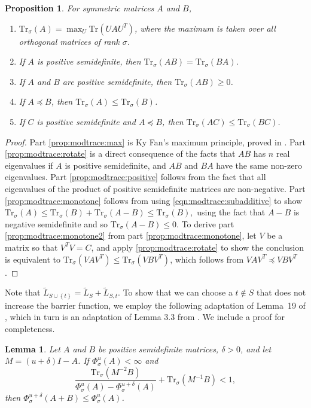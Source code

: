 \documentclass[11pt]{article}
\def\trace#1{\mathrm{Tr} \left(#1 \right)}
\def\Ltil{\widetilde{L}}
\def\union{\cup}
\def\pleq{\preccurlyeq}
\def\setof#1{\left\{#1  \right\}}
\def\trs#1{\mathrm{Tr}_{\sigma} \left(#1 \right)}
\newtheorem{lemma}[theorem]{Lemma}
\newtheorem{proposition}[theorem]{Proposition}
\begin{document}
\begin{proposition}\label{prop:modtrace}
For symmetric matrices $A$ and $B$,
  \begin{enumerate}[label=\alph*., ref=\alph*]
    \item $\trs{A} = \max_{U} \trace{U A U^T}$, where the maximum is taken over all orthogonal matrices of rank $\sigma$. \label{prop:modtrace:max}
    \item If $A$ is positive semidefinite, then $\trs{AB} = \trs{BA}$. \label{prop:modtrace:rotate}
    \item If $A$ and $B$ are positive semidefinite, then $\trs{AB} \geq 0$. \label{prop:modtrace:positive}
    \item If $A \pleq B$, then $\trs{A} \leq \trs{B}$. \label{prop:modtrace:monotone}
    \item If $C$ is positive semidefinite and $A \pleq B$, then $\trs{AC} \leq \trs{BC}$. \label{prop:modtrace:monotone2}
  \end{enumerate}
\end{proposition}
\begin{proof}
Part \ref{prop:modtrace:max} is Ky Fan's maximum principle, proved in \cite{KyFanWeyl}. Part \ref{prop:modtrace:rotate} is a direct consequence of the facts that $AB$ has $n$ real eigenvalues if $A$ is positive semidefinite, and $AB$ and $BA$ have the same non-zero eigenvalues. 
Part \ref{prop:modtrace:positive} follows from the fact that all eigenvalues of the product of positive semidefinite matrices are non-negative.
Part \ref{prop:modtrace:monotone} follows from using \eqref{eqn:modtrace:subadditive} to show $\trs{A} \leq \trs{B} + \trs{A - B} \leq \trs{B},$ using the fact that $A - B$ is negative semidefinite and so $\trs{A - B} \leq 0$.  
To derive part \ref{prop:modtrace:monotone2} from part \ref{prop:modtrace:monotone}, let $V$ be a matrix so that $V^T V = C$, and apply \ref{prop:modtrace:rotate} to show the conclusion is equivalent to $\trs{V A V^T} \leq \trs{V B V^T}$, which follows from $V A V^T \pleq V B V^T$.
\end{proof}


Note that $\Ltil_{S \union \setof{t}} = \Ltil_{S} + \Ltil_{S,t}$.
To show that we can choose a $t \not \in S$ that does not increase the barrier function, 
  we employ the following adaptation of 
 Lemma~19 of \cite{CarliSilvaHS}, which in turn is an adaptation of Lemma 3.3 from \cite{BSS}.
We include a proof for completeness.

\begin{lemma}\label{lem:upperBarrier}
Let $A$ and $B$ be positive semidefinite matrices, $\delta > 0$, and let $M = (u+\delta)I - A$.
If $\Phi^{u}_{\sigma} (A) < \infty$ and
\begin{equation}\label{eqn:upperBarrier}
\frac{\trs{M^{-2} B}}
     {\Phi^{u}_{\sigma} (A) - \Phi^{u+\delta }_{\sigma} (A) }
+ 
\trs{M^{-1} B}
< 1, 
\end{equation}
then $\Phi^{u+\delta}_{\sigma} (A + B) \leq \Phi^{u}_{\sigma} (A)$.
\end{lemma}
\end{document}

